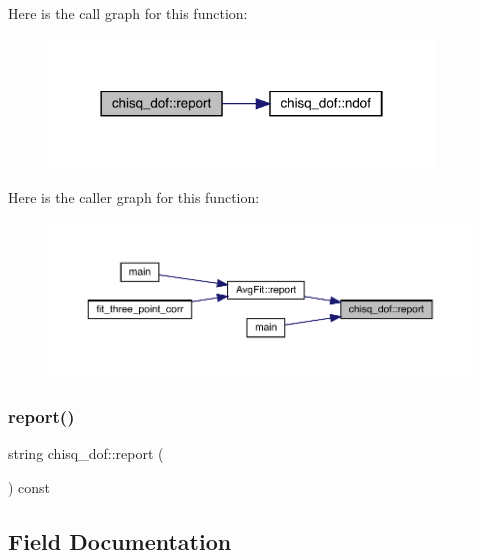 Here is the call graph for this function\+:
\nopagebreak
\begin{figure}[H]
\begin{center}
\leavevmode
\includegraphics[width=290pt]{d0/dcc/structchisq__dof_afa6ae05c4bc5fb54e635447c3358b09d_cgraph}
\end{center}
\end{figure}
Here is the caller graph for this function\+:
\nopagebreak
\begin{figure}[H]
\begin{center}
\leavevmode
\includegraphics[width=350pt]{d0/dcc/structchisq__dof_afa6ae05c4bc5fb54e635447c3358b09d_icgraph}
\end{center}
\end{figure}
\mbox{\label{structchisq__dof_afa6ae05c4bc5fb54e635447c3358b09d}} 
\subsubsection{\texorpdfstring{report()}{report()}\hspace{0.1cm}{\footnotesize\ttfamily [2/2]}}
{\footnotesize\ttfamily string chisq\+\_\+dof\+::report (\begin{DoxyParamCaption}{ }\end{DoxyParamCaption}) const}



\subsection{Field Documentation}
\mbox{\label{structchisq__dof_ac10dc61cd9ea8b167b6907a463dc9fab}} 
